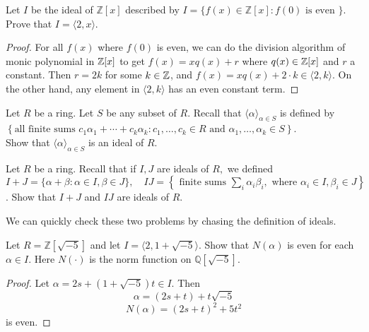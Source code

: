 \documentclass[12pt,twoside=semi,openright,numbers=noenddot]{scrbook}
\begin{document}
\begin{problem}
    Let $I$ be the ideal of $\mathbb{Z}[x]$ described by $I=\{f(x) \in \mathbb{Z}[x]: f(0) \text { is even }\}$. 
    Prove that $I=\langle 2, x\rangle$.
\end{problem}
    \begin{proof}
        For all $f(x)$ where $f(0)$ is even, we can do the division algorithm of monic polynomial in $\mathbb Z[x]$ to get 
        $f(x) = xq(x)+r$ where $q(x)\in \mathbb Z[x]$ and $r$ a constant. Then $r = 2k$ for some $k \in \mathbb Z$, and 
        $f(x) = xq(x)+2\cdot k \in \langle 2, k\rangle$. On the other hand, any element in $\langle 2,k\rangle$ has an even constant term.
    \end{proof}
\begin{problem}
    Let $R$ be a ring. Let $S$ be any subset of $R$. Recall that $\langle\alpha\rangle_{\alpha \in S}$ is defined by
    $\left\{\text {all finite sums } c_{1} \alpha_{1}+\cdots+c_{k} \alpha_{k}: c_{1}, \ldots, c_{k} \in R \text { and } \alpha_{1}, \ldots, \alpha_{k} \in S\right\}$.\\
    Show that $\langle\alpha\rangle_{\alpha \in S}$ is an ideal of $R$.
\end{problem}
\begin{problem}
    Let $R$ be a ring. Recall that if $I, J$ are ideals of $R,$ we defined
    $I+J=\{\alpha+\beta: \alpha \in I, \beta \in J\}, \quad I J=\left\{\text { finite sums } \sum_{i} \alpha_{i} \beta_{i}, \text { where } \alpha_{i} \in I, \beta_{i} \in J\right\}$.
    Show that $I+J$ and $I J$ are ideals of $R$.
\end{problem}
    We can quickly check these two problems by chasing the definition of ideals.

\begin{problem}
    Let $R=\mathbb{Z}[\sqrt{-5}]$ and let $I=\langle 2,1+\sqrt{-5}\rangle .$ Show that $N(\alpha)$ is even for each $\alpha \in I$.
    Here $N(\cdot)$ is the norm function on $\mathbb{Q}[\sqrt{-5}]$.
\end{problem}
    \begin{proof}
        Let $\alpha = 2s+(1+\sqrt{-5})t \in I$. Then 
        $$ \alpha = (2s+t) + t\sqrt{-5}$$
        $$ N(\alpha) = (2s+t)^2 + 5t^2$$
        is even.
    \end{proof}
\end{document}
